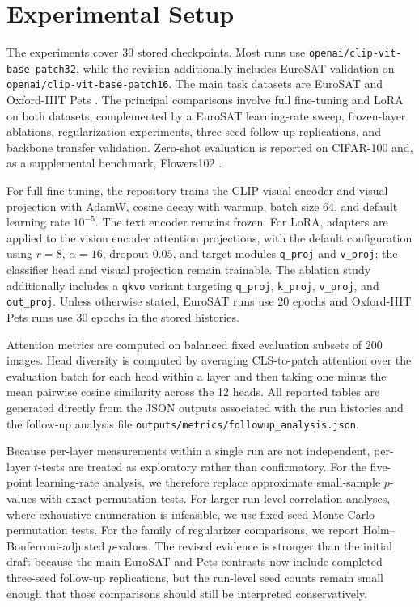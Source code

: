 \documentclass[10pt]{article}
\begin{document}
\section{Experimental Setup}
The experiments cover 39 stored checkpoints. Most runs use \texttt{openai/clip-vit-base-patch32}, while the revision additionally includes EuroSAT validation on \texttt{openai/clip-vit-base-patch16}. The main task datasets are EuroSAT \citep{helber2019eurosat} and Oxford-IIIT Pets \citep{parkhi2012cats}. The principal comparisons involve full fine-tuning and LoRA on both datasets, complemented by a EuroSAT learning-rate sweep, frozen-layer ablations, regularization experiments, three-seed follow-up replications, and backbone transfer validation. Zero-shot evaluation is reported on CIFAR-100 \citep{krizhevsky2009learning} and, as a supplemental benchmark, Flowers102 \citep{nilsback2008automated}.

For full fine-tuning, the repository trains the CLIP visual encoder and visual projection with AdamW, cosine decay with warmup, batch size 64, and default learning rate $10^{-5}$. The text encoder remains frozen. For LoRA, adapters are applied to the vision encoder attention projections, with the default configuration using $r=8$, $\alpha=16$, dropout $0.05$, and target modules \texttt{q\_proj} and \texttt{v\_proj}; the classifier head and visual projection remain trainable. The ablation study additionally includes a \texttt{qkvo} variant targeting \texttt{q\_proj}, \texttt{k\_proj}, \texttt{v\_proj}, and \texttt{out\_proj}. Unless otherwise stated, EuroSAT runs use 20 epochs and Oxford-IIIT Pets runs use 30 epochs in the stored histories.

Attention metrics are computed on balanced fixed evaluation subsets of 200 images. Head diversity is computed by averaging CLS-to-patch attention over the evaluation batch for each head within a layer and then taking one minus the mean pairwise cosine similarity across the 12 heads. All reported tables are generated directly from the JSON outputs associated with the run histories and the follow-up analysis file \texttt{outputs/metrics/followup\_analysis.json}.

Because per-layer measurements within a single run are not independent, per-layer $t$-tests are treated as exploratory rather than confirmatory. For the five-point learning-rate analysis, we therefore replace approximate small-sample $p$-values with exact permutation tests. For larger run-level correlation analyses, where exhaustive enumeration is infeasible, we use fixed-seed Monte Carlo permutation tests. For the family of regularizer comparisons, we report Holm--Bonferroni-adjusted $p$-values. The revised evidence is stronger than the initial draft because the main EuroSAT and Pets contrasts now include completed three-seed follow-up replications, but the run-level seed counts remain small enough that those comparisons should still be interpreted conservatively.
\end{document}
